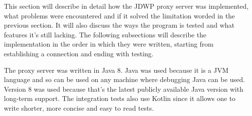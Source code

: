 \documentclass[..thesis.tex]{subfiles}
\begin{document}
This section will describe in detail how the JDWP proxy server was implemented, what problems were encountered and if it solved the limitation worded in the previous section.
It will also discuss the ways the program is tested and what features it's still lacking.
The following subsections will describe the implementation in the order in which they were written, starting from establishing a connection and ending with testing.

The proxy server was written in Java 8.
Java was used because it is a JVM language and so can be used on any machine where debugging Java can be used.
Version 8 was used because that's the latest publicly available Java version with long-term support.
The integration tests also use Kotlin since it allows one to write shorter, more concise and easy to read tests.
\end{document}

